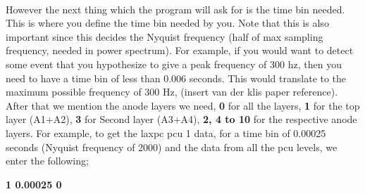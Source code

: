 \documentclass[a4paper,twoside]{report}
\numberwithin{equation}{section}
\begin{document}
\paragraph{}
However the next thing which the program will ask for is the time bin needed. This is where you define the time bin needed by you. Note that this is also important since this decides the Nyquist frequency (half of max sampling frequency, needed in power spectrum). For example, if you would want to detect some event that you hypothesize to give a peak frequency of 300 hz, then you need to have a time bin of less than 0.006 seconds. This would translate to the maximum possible frequency of 300 Hz, (insert van der klis paper reference). After that we mention the anode layers we need, \textbf{0} for all the layers, \textbf{1} for the top layer (A1+A2), \textbf{3} for Second layer (A3+A4), \textbf{2, 4 to 10} for the respective anode layers. For example, to get the laxpc pcu 1 data, for a time bin of 0.00025 seconds (Nyquist frequency of 2000) and the data from all the pcu levels, we enter the following;
\begin{center}
\textbf{1 0.00025 0}
\end{center}
\end{document}

